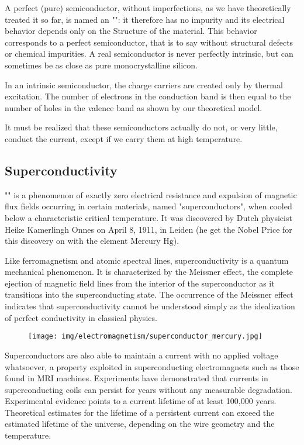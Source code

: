 	A perfect (pure) semiconductor, without imperfections, as we have theoretically treated it so far, is named an "": it therefore has no impurity and its electrical behavior depends only on the Structure of the material. This behavior corresponds to a perfect semiconductor, that is to say without structural defects or chemical impurities. A real semiconductor is never perfectly intrinsic, but can sometimes be as close as pure monocrystalline silicon.

	In an intrinsic semiconductor, the charge carriers are created only by thermal excitation. The number of electrons in the conduction band is then equal to the number of holes in the valence band as shown by our theoretical model.

	It must be realized that these semiconductors actually do not, or very little, conduct the current, except if we carry them at high temperature.
	
	
	\pagebreak
	\subsection{Superconductivity}
	"" is a phenomenon of exactly zero electrical resistance and expulsion of magnetic flux fields occurring in certain materials, named "superconductors", when cooled below a characteristic critical temperature. It was discovered by Dutch physicist Heike Kamerlingh Onnes on April 8, 1911, in Leiden (he get the Nobel Price for this discovery on with the element Mercury $\mathrm{Hg}$). 
	
	Like ferromagnetism and atomic spectral lines, superconductivity is a quantum mechanical phenomenon. It is characterized by the Meissner effect, the complete ejection of magnetic field lines from the interior of the superconductor as it transitions into the superconducting state. The occurrence of the Meissner effect indicates that superconductivity cannot be understood simply as the idealization of perfect conductivity in classical physics.
	\begin{figure}[H]
		\centering
		\texttt{[image: img/electromagnetism/superconductor\_mercury.jpg]}
	\end{figure}
	Superconductors are also able to maintain a current with no applied voltage whatsoever, a property exploited in superconducting electromagnets such as those found in MRI machines. Experiments have demonstrated that currents in superconducting coils can persist for years without any measurable degradation. Experimental evidence points to a current lifetime of at least 100,000 years. Theoretical estimates for the lifetime of a persistent current can exceed the estimated lifetime of the universe, depending on the wire geometry and the temperature.
	
